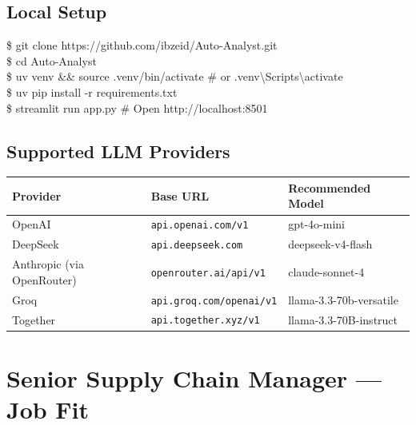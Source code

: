 \documentclass[11pt,a4paper]{article}
\begin{document}
\subsection{Local Setup}
\begin{tcolorbox}[colback=DarkCard, colframe=CareemGreen, leftrule=3mm, arc=4pt,
  fontupper=\color{LightText}\footnotesize\ttfamily]
\$ git clone https://github.com/ibzeid/Auto-Analyst.git\\
\$ cd Auto-Analyst\\
\$ uv venv \&\& source .venv/bin/activate \# or .venv\textbackslash Scripts\textbackslash activate\\
\$ uv pip install -r requirements.txt\\
\$ streamlit run app.py \# Open http://localhost:8501
\end{tcolorbox}

\vspace{0.5cm}
\subsection{Supported LLM Providers}
\begin{center}
\begin{tabular}{lll}
\toprule
\textbf{Provider} & \textbf{Base URL} & \textbf{Recommended Model} \\
\midrule
OpenAI & \texttt{api.openai.com/v1} & gpt-4o-mini \\
DeepSeek & \texttt{api.deepseek.com} & deepseek-v4-flash \\
Anthropic (via OpenRouter) & \texttt{openrouter.ai/api/v1} & claude-sonnet-4 \\
Groq & \texttt{api.groq.com/openai/v1} & llama-3.3-70b-versatile \\
Together & \texttt{api.together.xyz/v1} & llama-3.3-70B-instruct \\
\bottomrule
\end{tabular}
\end{center}

\section{Senior Supply Chain Manager --- Job Fit}
\end{document}
